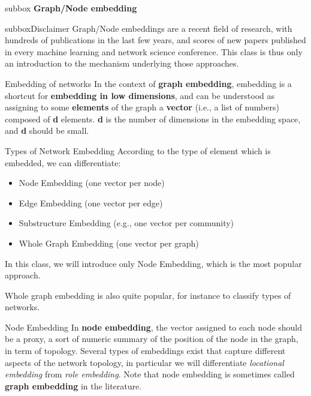 \documentclass[a4paper,11pt]{book}
\begin{document}

\newpage



\begin{subbox}{subbox}{}
\centering
\Large{\textbf{Graph/Node embedding}}
\end{subbox}


\begin{subbox}{subbox}{Disclaimer}
Graph/Node embeddings are a recent field of research, with hundreds of publications in the last few years, and scores of new papers published in every machine learning and network science conference. This class is thus only an introduction to the mechanism underlying those approaches.
\end{subbox}


\begin{textbox}{Embedding of networks}
In the context of \textbf{graph embedding}, embedding is a shortcut for \textbf{embedding in low dimensions}, and can be understood as assigning to some \textbf{elements} of the graph a \textbf{vector} (i.e., a list of numbers) composed of \textbf{d} elements. \textbf{d} is the number of dimensions in the embedding space, and \textbf{d} should be small.
\end{textbox}

\begin{textbox}{Types of Network Embedding}
According to the type of element which is embedded, we can differentiate:
\begin{itemize}
    \item Node Embedding (one vector per node)
    \item Edge Embedding (one vector per edge)
    \item Substructure Embedding (e.g., one vector per community)
    \item Whole Graph Embedding (one vector per graph)
\end{itemize}

In this class, we will introduce only Node Embedding, which is the most popular approach.

Whole graph embedding is also quite popular, for instance to classify types of networks.
\end{textbox}


\begin{textbox}{Node Embedding}
In \textbf{node embedding}, the vector assigned to each node should be a proxy, a sort of numeric summary of the position of the node in the graph, in term of topology. Several types of embeddings exist that capture different aspects of the network topology, in particular we will differentiate \textit{locational embedding} from \textit{role embedding}. Note that node embedding is sometimes called \textbf{graph embedding} in the literature.
\end{textbox}
\end{document}

